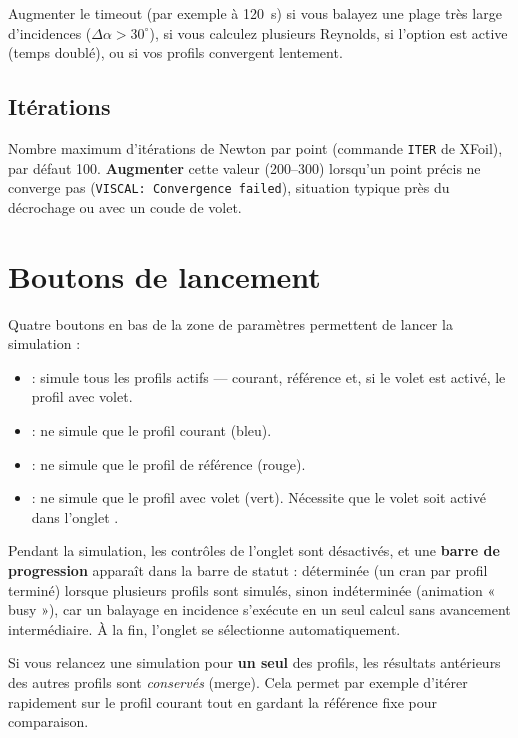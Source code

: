 \begin{attention}
Augmenter le timeout (par exemple à 120~s) si vous balayez une
plage très large d'incidences ($\Delta \alpha > 30^\circ$), si vous
calculez plusieurs Reynolds, si l'option 
est active (temps doublé), ou si vos profils convergent lentement.
\end{attention}

\subsection{Itérations}

Nombre maximum d'itérations de Newton par point (commande
\texttt{ITER} de XFoil), par défaut 100. \textbf{Augmenter} cette
valeur (200--300) lorsqu'un point précis ne converge pas
(\texttt{VISCAL: Convergence failed}), situation typique près du
décrochage ou avec un coude de volet.

\section{Boutons de lancement}

Quatre boutons en bas de la zone de paramètres permettent de lancer
la simulation :

\begin{itemize}
    \item {} : simule tous les profils actifs ---
        courant, référence et, si le volet est activé, le profil
        avec volet.
    \item {} : ne simule que le profil courant
        (bleu).
    \item {} : ne simule que le profil de
        référence (rouge).
    \item {} : ne simule que le profil avec volet
        (vert). Nécessite que le volet soit activé dans l'onglet
        .
\end{itemize}

Pendant la simulation, les contrôles de l'onglet sont désactivés,
et une \textbf{barre de progression} apparaît dans la barre de
statut : déterminée (un cran par profil terminé) lorsque plusieurs
profils sont simulés, sinon indéterminée (animation « busy »), car un
balayage en incidence s'exécute en un seul calcul sans avancement
intermédiaire. À la fin, l'onglet  se sélectionne
automatiquement.

\begin{important}
Si vous relancez une simulation pour \textbf{un seul} des profils,
les résultats antérieurs des autres profils sont \emph{conservés}
(merge). Cela permet par exemple d'itérer rapidement sur le profil
courant tout en gardant la référence fixe pour comparaison.
\end{important}

